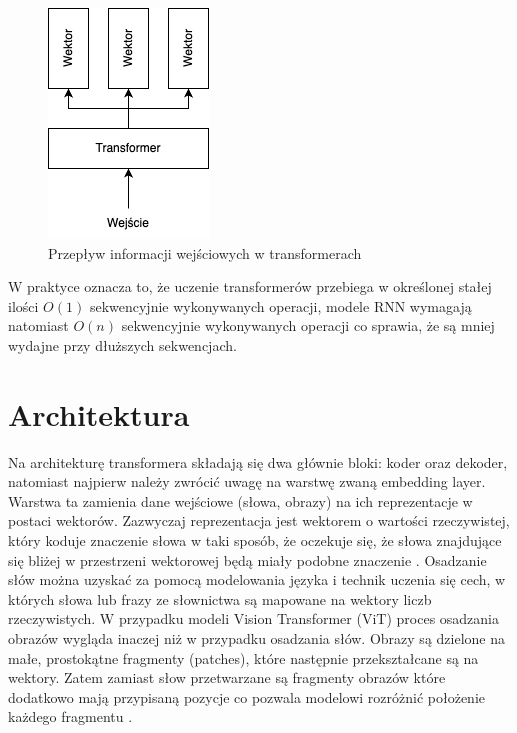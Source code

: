 \documentclass[12pt,a4paper,twoside]{book} %
\begin{document}
\begin{figure}[H]
    \centering
	\includegraphics[scale=0.60]{figs/transformer.png}
	\caption{Przepływ informacji wejściowych w transformerach}
	\label{fig:transformer_schema}
\end{figure}

W praktyce oznacza to, że uczenie transformerów przebiega w określonej stałej ilości $O(1)$ sekwencyjnie wykonywanych operacji, modele RNN wymagają natomiast $O(n)$ sekwencyjnie wykonywanych operacji co sprawia, że są mniej wydajne przy dłuższych sekwencjach.

\section{Architektura}

Na architekturę transformera składają się dwa głównie bloki: koder oraz dekoder, natomiast najpierw należy zwrócić uwagę na warstwę zwaną embedding layer.
Warstwa ta zamienia dane wejściowe (słowa, obrazy) na ich reprezentacje w postaci wektorów.
Zazwyczaj reprezentacja jest wektorem o wartości rzeczywistej, który koduje znaczenie słowa w taki sposób, że oczekuje się, że słowa znajdujące się bliżej w przestrzeni wektorowej będą miały podobne znaczenie \cite{jm3}.
Osadzanie słów można uzyskać za pomocą modelowania języka i technik uczenia się cech, w których słowa lub frazy ze słownictwa są mapowane na wektory liczb rzeczywistych.
W przypadku modeli Vision Transformer (ViT) proces osadzania obrazów wygląda inaczej niż w przypadku osadzania słów.
Obrazy są dzielone na małe, prostokątne fragmenty (patches), które następnie przekształcane są na wektory.
Zatem zamiast słow przetwarzane są fragmenty obrazów które dodatkowo mają przypisaną pozycje co pozwala modelowi rozróżnić położenie każdego fragmentu \cite{DBLP:journals/corr/abs-2010-11929}.
\end{document}
